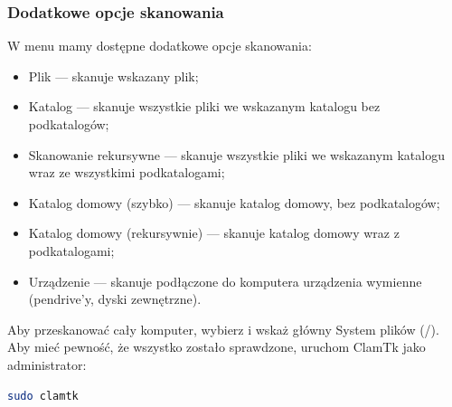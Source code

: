 \subsubsection{Dodatkowe opcje skanowania}
W menu  mamy dostępne dodatkowe opcje skanowania:
\begin{itemize}
\item \textcolor{ubuntu_orange}{Plik} --- skanuje wskazany plik;
\item \textcolor{ubuntu_orange}{Katalog} --- skanuje wszystkie pliki we wskazanym katalogu bez podkatalogów;
\item \textcolor{ubuntu_orange}{Skanowanie rekursywne} --- skanuje wszystkie pliki we wskazanym katalogu wraz ze wszystkimi podkatalogami;
\item \textcolor{ubuntu_orange}{Katalog domowy (szybko)} --- skanuje katalog domowy, bez podkatalogów;
\item \textcolor{ubuntu_orange}{Katalog domowy (rekursywnie)} --- skanuje katalog domowy wraz z podkatalogami;
\item \textcolor{ubuntu_orange}{Urządzenie} --- skanuje podłączone do komputera urządzenia wymienne (pendrive'y, dyski zewnętrzne).
\end{itemize}

Aby przeskanować cały komputer, wybierz  i wskaż główny \textcolor{ubuntu_orange}{System plików} (/). Aby mieć pewność, że wszystko zostało sprawdzone, uruchom ClamTk jako administrator:
\begin{lstlisting}[language=bash]
sudo clamtk
\end{lstlisting}
